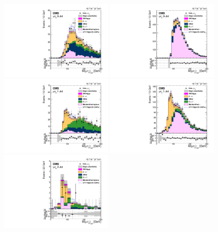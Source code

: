 \documentclass[oneside, letterpaper, oldfontcommands]{memoir}
\begin{document}
{{{\begin{figure}[hbtp]\centering
 \includegraphics[width=0.48\textwidth]{muele_GG_m_colinear_UNBLIND_PostFit.pdf}
 \includegraphics[width=0.48\textwidth]{muhad_GG_m_colinear_UNBLIND_PostFit.pdf}
 \includegraphics[width=0.48\textwidth]{muele_Boost_m_colinear_UNBLIND_PostFit.pdf}
 \includegraphics[width=0.48\textwidth]{muhad_Boost_m_colinear_UNBLIND_PostFit.pdf}
 \includegraphics[width=0.48\textwidth]{muele_VBF_m_colinear_UNBLIND_PostFit.pdf}

\end{figure}}}}
\end{document}
